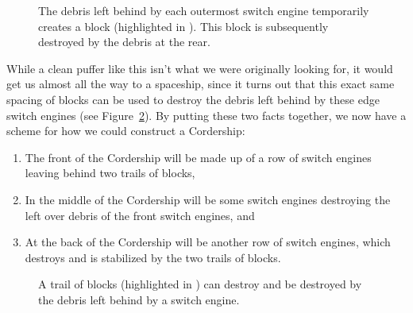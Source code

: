 \begin{figure}[!htb]
	\centering{}
	\caption{The debris left behind by each outermost switch engine temporarily creates a block (highlighted in ). This block is subsequently destroyed by the debris at the rear.}\label{fig:switch_engine_blocks}
\end{figure}

While a clean puffer like this isn't what we were originally looking for, it would get us almost all the way to a spaceship, since it turns out that this exact same spacing of blocks can be used to destroy the debris left behind by these edge switch engines (see Figure~\ref{fig:switch_engine_blocks_destroy}). By putting these two facts together, we now have a scheme for how we could construct a Cordership:\smallskip

\begin{enumerate}
	\item[1)] The front of the Cordership will be made up of a row of switch engines leaving behind two trails of blocks,\smallskip
	
	\item[2)] In the middle of the Cordership will be some switch engines destroying the left over debris of the front switch engines, and\smallskip
	
	\item[3)] At the back of the Cordership will be another row of switch engines, which destroys and is stabilized by the two trails of blocks.\smallskip
\end{enumerate}

\begin{figure}[!htb]
	\centering{}
	\caption{A trail of blocks (highlighted in ) can destroy and be destroyed by the debris left behind by a switch engine.}\label{fig:switch_engine_blocks_destroy}
\end{figure}


